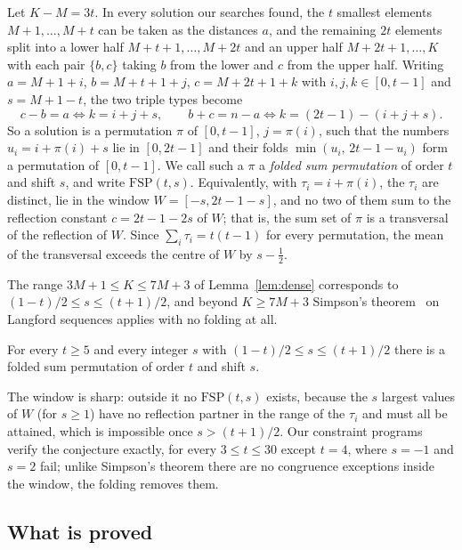Let $K-M=3t$.  In every solution our searches found, the $t$ smallest elements
$M+1,\dots,M+t$ can be taken as the distances $a$, and the remaining $2t$
elements split into a lower half $M+t+1,\dots,M+2t$ and an upper half
$M+2t+1,\dots,K$ with each pair $\{b,c\}$ taking $b$ from the lower and $c$
from the upper half.  Writing $a=M+1+i$, $b=M+t+1+j$, $c=M+2t+1+k$ with
$i,j,k\in[0,t-1]$ and $s=M+1-t$, the two triple types become
\[
  c-b=a\iff k=i+j+s,\qquad b+c=n-a\iff k=(2t-1)-(i+j+s).
\]
So a solution is a permutation $\pi$ of $[0,t-1]$, $j=\pi(i)$, such that the
numbers $u_i=i+\pi(i)+s$ lie in $[0,2t-1]$ and their folds
$\min(u_i,\,2t-1-u_i)$ form a permutation of $[0,t-1]$.  We call such a $\pi$
a \emph{folded sum permutation} of order $t$ and shift $s$, and write
$\mathrm{FSP}(t,s)$.  Equivalently, with $\tau_i=i+\pi(i)$, the $\tau_i$ are
distinct, lie in the window $W=[-s,2t-1-s]$, and no two of them sum to the
reflection constant $c=2t-1-2s$ of $W$; that is, the sum set of $\pi$ is a
transversal of the reflection of $W$.  Since $\sum_i\tau_i=t(t-1)$ for every
permutation, the mean of the transversal exceeds the centre of $W$ by
$s-\tfrac12$.

The range $3M+1\le K\le 7M+3$ of Lemma~\ref{lem:dense} corresponds to
$(1-t)/2\le s\le(t+1)/2$, and beyond $K\ge7M+3$ Simpson's theorem~\cite{Simpson1983} on Langford
sequences applies with no folding at all.

\begin{conjecture}\label{conj:fsp}
For every $t\ge5$ and every integer $s$ with $(1-t)/2\le s\le(t+1)/2$ there is
a folded sum permutation of order $t$ and shift $s$.
\end{conjecture}

The window is sharp: outside it no $\mathrm{FSP}(t,s)$ exists, because the
$s$ largest values of $W$ (for $s\ge1$) have no reflection partner in the
range of the $\tau_i$ and must all be attained, which is impossible once
$s>(t+1)/2$.  Our constraint programs verify the conjecture exactly, for every $3\le t\le30$ except $t=4$, where $s=-1$ and $s=2$
fail; unlike Simpson's theorem there are no congruence exceptions inside the
window, the folding removes them.

\subsection{What is proved}

